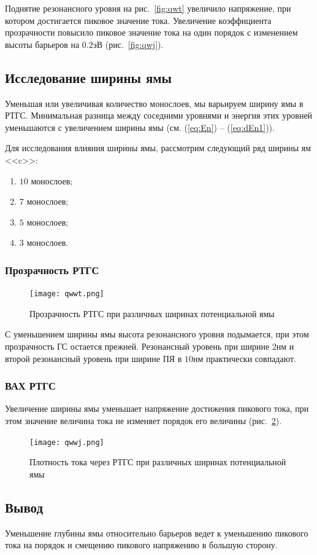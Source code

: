 Поднятие резонансного уровня на рис.~\ref{fig:qwt} увеличило напряжение, при котором достигается пиковое значение тока. Увеличение коэффициента прозрачности повысило пиковое значение тока на один порядок с изменением высоты барьеров на $0.2$эВ (рис.~\ref{fig:qwj}).

\subsection{Исследование ширины ямы}
Уменьшая или увеличивая количество монослоев, мы варьируем ширину ямы в РТГС. Минимальная разница между соседними уровнями и энергия этих уровней уменьшаются с увеличением ширины ямы (см. (\ref{eq:En}) -- (\ref{eq:dEn1})).

Для исследования влияния ширины ямы, рассмотрим следующий ряд ширины ям <<c>>:
\begin{enumerate}
	\item $10$ монослоев;
	\item $7$ монослоев;
	\item $5$ монослоев;
	\item $3$ монослоев.
\end{enumerate}

\subsubsection{Прозрачность РТГС}
\begin{figure}[h!]
	\centering
	\texttt{[image: qwwt.png]}
	\caption{Прозрачность РТГС при различных ширинах потенциальной ямы}
	\label{fig:qwwt}
\end{figure}

С уменьшением ширины ямы высота резонансного уровня подымается, при этом прозрачность ГС остается прежней. Резонансный уровень при ширине $2$нм и второй резонансный уровень при ширине ПЯ в $10$нм практически совпадают. 
\subsubsection{ВАХ РТГС}
Увеличение ширины ямы уменьшает напряжение достижения пикового тока, при этом значение величина тока не изменяет порядок его величины (рис.~\ref{fig:qwwj}).

\begin{figure}[h!]
	\centering
	\texttt{[image: qwwj.png]}
	\caption{Плотность тока через РТГС при различных ширинах потенциальной ямы}
	\label{fig:qwwj}
\end{figure}

\subsection{Вывод}
Уменьшение глубины ямы относительно барьеров ведет к уменьшению пикового тока на порядок и смещению пикового напряжению в большую сторону.